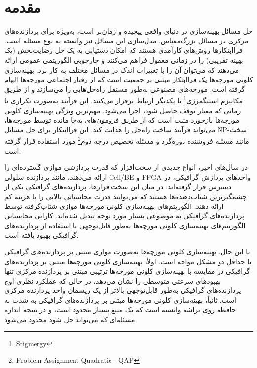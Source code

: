 \documentclass[a4paper,10pt]{article}
\begin{document}

    \section{مقدمه}

        حل مسائل بهینه‌سازی در دنیای واقعی پیچیده و زمان‌بر است، به‌ویژه برای پردازنده‌های مرکزی در مسائل بزرگ‌مقیاس. مدل‌سازی این مسائل نیز وابسته به نوع مسئله است. فراابتکارها روش‌های کارآمدی هستند که امکان دستیابی به یک حل رضایت‌بخش (یک بهینه تقریبی) را در زمانی معقول فراهم می‌کنند و چارچوبی الگوریتمی عمومی ارائه می‌دهند که می‌توان آن را با تغییرات اندک در مسائل مختلف به کار برد. بهینه‌سازی کلونی مورچه‌ها یک فراابتکار مبتنی بر جمعیت است که از رفتار اجتماعی مورچه‌ها الهام گرفته است. مورچه‌های مصنوعی به‌طور مستقل راه‌حل‌هایی را می‌سازند و از طریق مکانیزم استیگمرژی\footnote{\hspace{2pt}Stigmergy} با یکدیگر ارتباط برقرار می‌کنند. این فرآیند به‌صورت تکراری تا زمانی که معیار توقف حاصل شود، اجرا می‌شود. مهم‌ترین ویژگی بهینه‌سازی کلونی مورچه‌ها بازخورد مثبت است که از طریق فرومون‌های به‌جا مانده توسط مورچه‌ها، می‌تواند فرآیند ساخت راه‌حل را هدایت کند. این فراابتکار برای حل مسائل NP-سخت مانند مسئله فروشنده دوره‌گرد و مسئله تخصیص درجه دوم\footnote{\hspace{2pt}Problem Assignment Quadratic - QAP} مورد استفاده قرار گرفته است.

        در سال‌های اخیر، انواع جدیدی از سخت‌افزار که قدرت پردازشی موازی گسترده‌ای را ارائه می‌دهند، مانند پردازنده سلولی Cell/BE و FPGA واحدهای پردازش گرافیکی، در دسترس قرار گرفته‌اند. در میان این سخت‌افزارها، پردازنده‌های گرافیکی یکی از چشمگیرترین شتاب‌دهنده‌ها هستند که می‌توانند قدرت محاسباتی بالایی را با هزینه کم ارائه دهند. الگوریتم‌های بهینه‌سازی کلونی مورچه‌ها موازی شتاب‌گرفته توسط پردازنده‌های گرافیکی به موضوعی بسیار مورد توجه تبدیل شده‌اند. کارایی محاسباتی الگوریتم‌های بهینه‌سازی کلونی مورچه‌ها به‌طور قابل‌توجهی با استفاده از پردازنده‌های گرافیکی بهبود یافته است.

        با این حال، بهینه‌سازی کلونی مورچه‌ها به‌صورت موازی مبتنی بر پردازنده‌های گرافیکی با حداقل دو مشکل مواجه است. اولاً، بهینه‌سازی کلونی مورچه‌ها مبتنی بر پردازنده‌های گرافیکی در مقایسه با بهینه‌سازی کلونی مورچه‌ها ترتیبی مبتنی بر پردازنده مرکزی تنها بهبودهای سرعتی متوسطی را نشان می‌دهد، در حالی که عملکرد نظری اوج پردازنده‌های گرافیکی به‌طور قابل‌توجهی بالاتر از یک ریسمان واحد پردازنده مرکزی است. ثانیاً، بهینه‌سازی کلونی مورچه‌ها مبتنی بر پردازنده‌های گرافیکی به شدت به حافظه روی تراشه وابسته است که یک منبع بسیار محدود است، و در نتیجه اندازه مسئله‌ای که می‌تواند حل شود محدود می‌شود.
\end{document}
